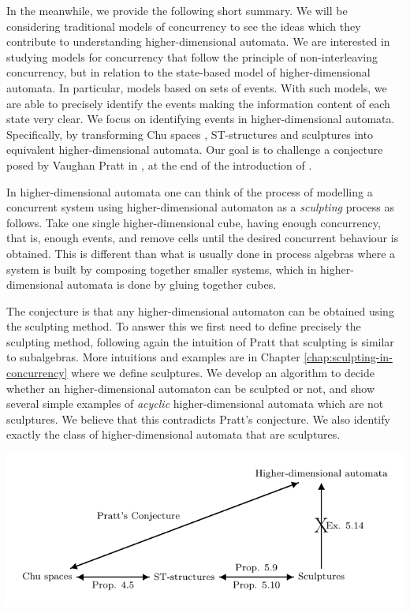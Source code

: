         In the meanwhile, we provide the following short summary. We will be considering traditional models of concurrency to see the ideas which they contribute to understanding higher-dimensional automata. We are interested in studying models for concurrency that follow the principle of non-interleaving concurrency, but in relation to the state-based model of higher-dimensional automata. In particular, models based on sets of events. With such models, we are able to precisely identify the events making the information content of each state very clear. We focus on identifying events in higher-dimensional automata. Specifically, by transforming Chu spaces \cite{gupta94phd_Chu}, ST-structures \cite{Johansen16STstruct} and sculptures into equivalent higher-dimensional automata. Our goal is to challenge a conjecture posed by Vaughan Pratt in \cite{Pratt00Sculptures}, at the end of the introduction of \cite{Pratt00Sculptures}.
        
        In higher-dimensional automata one can think of the process of modelling a concurrent system using higher-dimensional automaton as a \textit{sculpting} process as follows. Take one single higher-dimensional cube, having enough concurrency, that is, enough events, and remove cells until the desired concurrent behaviour is obtained. This is different than what is usually done in process algebras where a system is built by composing together smaller systems, which in higher-dimensional automata is done by gluing together cubes.
    
        The conjecture is that any higher-dimensional automaton can be obtained using the sculpting method. To answer this we first need to define precisely the sculpting method, following again the intuition of Pratt that sculpting is similar to subalgebras. More intuitions and examples are in Chapter \ref{chap:sculpting-in-concurrency} where we define sculptures.  We develop an algorithm to decide whether an higher-dimensional automaton can be sculpted or not, and show several simple examples of \emph{acyclic} higher-dimensional automata which are not sculptures. We believe that this contradicts Pratt's conjecture. We also identify exactly the class of higher-dimensional automata that are sculptures.
        
        \begin{center}
            \includegraphics[scale=1]{Figures/4.Relationship-with-other-models-of-concurrency/Chu-spaces-and-ST-structures/argument-diagram.pdf}
        \end{center}
        
